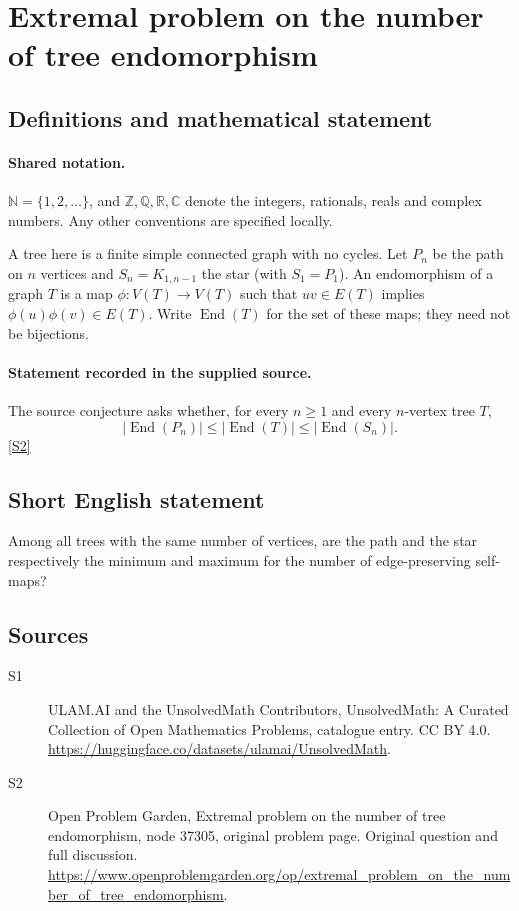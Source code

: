 \documentclass[11pt]{article}
\newcommand{\sref}[2]{\hyperlink{source:#1:#2}{[S#2]}}
\begin{document}
\section{Extremal problem on the number of tree endomorphism}\label{statement}

\subsection{Definitions and mathematical statement}

\paragraph{Shared notation.}$\mathbb N=\{1,2,\ldots\}$, and $\mathbb Z,\mathbb Q,\mathbb R,\mathbb C$ denote the integers, rationals, reals and complex numbers. Any other conventions are specified locally.


A tree here is a finite simple connected graph with no cycles. Let $P_n$ be the path on $n$ vertices and $S_n=K_{1,n-1}$ the star (with $S_1=P_1$). An endomorphism of a graph $T$ is a map $\phi:V(T)\to V(T)$ such that $uv\in E(T)$ implies $\phi(u)\phi(v)\in E(T)$. Write $\operatorname{End}(T)$ for the set of these maps; they need not be bijections.
\paragraph{Statement recorded in the supplied source.}
The source conjecture asks whether, for every $n\geq1$ and every $n$-vertex tree $T$,\[ |\operatorname{End}(P_n)|\leq |\operatorname{End}(T)|\leq |\operatorname{End}(S_n)|. \] \sref{statement}{2}
\subsection{Short English statement}
Among all trees with the same number of vertices, are the path and the star respectively the minimum and maximum for the number of edge-preserving self-maps?
\subsection{Sources}
\begin{description}
\item[\hypertarget{source:statement:1}{S1}] ULAM.AI and the UnsolvedMath Contributors, UnsolvedMath: A Curated Collection of Open Mathematics Problems, catalogue entry. CC BY 4.0. \url{https://huggingface.co/datasets/ulamai/UnsolvedMath}.
\item[\hypertarget{source:statement:2}{S2}] Open Problem Garden, Extremal problem on the number of tree endomorphism, node 37305, original problem page. Original question and full discussion. \url{https://www.openproblemgarden.org/op/extremal_problem_on_the_number_of_tree_endomorphism}.

\end{description}
\label{end:statement}
\end{document}
